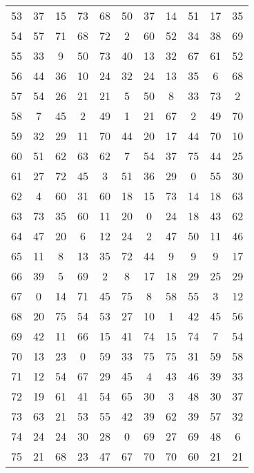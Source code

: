 \begin{table}
\begin{tabular}{c c c c c c c c c c c }
53 & 37 & 15 & 73 & 68 & 50 & 37 & 14 & 51 & 17 & 35 \\
54 & 57 & 71 & 68 & 72 & 2 & 60 & 52 & 34 & 38 & 69 \\
55 & 33 & 9 & 50 & 73 & 40 & 13 & 32 & 67 & 61 & 52 \\
56 & 44 & 36 & 10 & 24 & 32 & 24 & 13 & 35 & 6 & 68 \\
57 & 54 & 26 & 21 & 21 & 5 & 50 & 8 & 33 & 73 & 2 \\
58 & 7 & 45 & 2 & 49 & 1 & 21 & 67 & 2 & 49 & 70 \\
59 & 32 & 29 & 11 & 70 & 44 & 20 & 17 & 44 & 70 & 10 \\
60 & 51 & 62 & 63 & 62 & 7 & 54 & 37 & 75 & 44 & 25 \\
61 & 27 & 72 & 45 & 3 & 51 & 36 & 29 & 0 & 55 & 30 \\
62 & 4 & 60 & 31 & 60 & 18 & 15 & 73 & 14 & 18 & 63 \\
63 & 73 & 35 & 60 & 11 & 20 & 0 & 24 & 18 & 43 & 62 \\
64 & 47 & 20 & 6 & 12 & 24 & 2 & 47 & 50 & 11 & 46 \\
65 & 11 & 8 & 13 & 35 & 72 & 44 & 9 & 9 & 9 & 17 \\
66 & 39 & 5 & 69 & 2 & 8 & 17 & 18 & 29 & 25 & 29 \\
67 & 0 & 14 & 71 & 45 & 75 & 8 & 58 & 55 & 3 & 12 \\
68 & 20 & 75 & 54 & 53 & 27 & 10 & 1 & 42 & 45 & 56 \\
69 & 42 & 11 & 66 & 15 & 41 & 74 & 15 & 74 & 7 & 54 \\
70 & 13 & 23 & 0 & 59 & 33 & 75 & 75 & 31 & 59 & 58 \\
71 & 12 & 54 & 67 & 29 & 45 & 4 & 43 & 46 & 39 & 33 \\
72 & 19 & 61 & 41 & 54 & 65 & 30 & 3 & 48 & 30 & 37 \\
73 & 63 & 21 & 53 & 55 & 42 & 39 & 62 & 39 & 57 & 32 \\
74 & 24 & 24 & 30 & 28 & 0 & 69 & 27 & 69 & 48 & 6 \\
75 & 21 & 68 & 23 & 47 & 67 & 70 & 70 & 60 & 21 & 21 \\
\hline
\end{tabular}
\end{table}